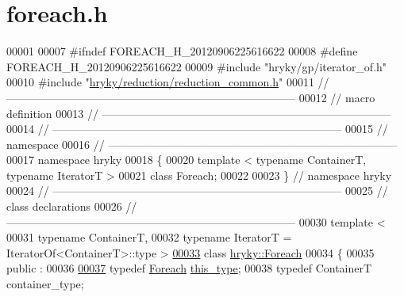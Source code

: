 \hypertarget{foreach_8h_source}{\section{foreach.\-h}
}

\begin{DoxyCode}
00001 
00007 \textcolor{preprocessor}{#ifndef FOREACH\_H\_20120906225616622}
00008 \textcolor{preprocessor}{}\textcolor{preprocessor}{#define FOREACH\_H\_20120906225616622}
00009 \textcolor{preprocessor}{}\textcolor{preprocessor}{#include "hryky/gp/iterator\_of.h"}
00010 \textcolor{preprocessor}{#include "\hyperlink{reduction__common_8h}{hryky/reduction/reduction_common.h}"}
00011 \textcolor{comment}{//
      ------------------------------------------------------------------------------}
00012 \textcolor{comment}{// macro definition}
00013 \textcolor{comment}{//
      ------------------------------------------------------------------------------}
00014 \textcolor{comment}{//
      ------------------------------------------------------------------------------}
00015 \textcolor{comment}{// namespace}
00016 \textcolor{comment}{//
      ------------------------------------------------------------------------------}
00017 \textcolor{keyword}{namespace }hryky
00018 \{
00020     \textcolor{keyword}{template} < \textcolor{keyword}{typename} ContainerT, \textcolor{keyword}{typename} IteratorT >
00021     \textcolor{keyword}{class }Foreach;
00022 
00023 \} \textcolor{comment}{// namespace hryky}
00024 \textcolor{comment}{//
      ------------------------------------------------------------------------------}
00025 \textcolor{comment}{// class declarations}
00026 \textcolor{comment}{//
      ------------------------------------------------------------------------------}
00030 \textcolor{comment}{}\textcolor{keyword}{template} <
00031     \textcolor{keyword}{typename} ContainerT,
00032     \textcolor{keyword}{typename} IteratorT = IteratorOf<ContainerT>::type >
\hypertarget{foreach_8h_source_l00033}{}\hyperlink{classhryky_1_1_foreach}{00033} \textcolor{keyword}{class }\hyperlink{classhryky_1_1_foreach}{hryky::Foreach}
00034 \{
00035 \textcolor{keyword}{public} :
00036 
\hypertarget{foreach_8h_source_l00037}{}\hyperlink{classhryky_1_1_foreach_a57418e3f3130d8e58f62b54d6c209798}{00037}     \textcolor{keyword}{typedef} \hyperlink{classhryky_1_1_foreach}{Foreach}                                 \hyperlink{classhryky_1_1_foreach_a57418e3f3130d8e58f62b54d6c209798}{this_type};
00038     \textcolor{keyword}{typedef} ContainerT                              container\_type;

\end{DoxyCode}
